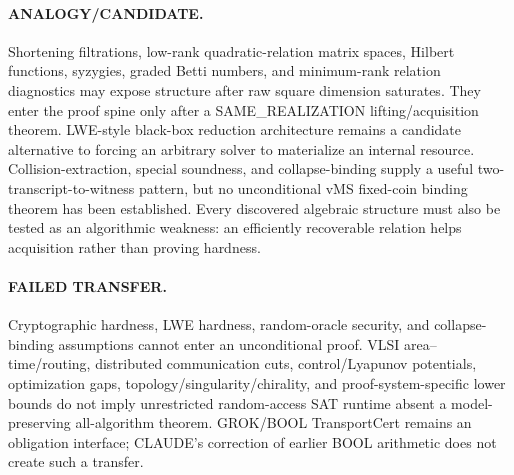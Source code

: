 \documentclass[11pt]{article}
\begin{document}
\paragraph{ANALOGY/CANDIDATE.}
Shortening filtrations, low-rank quadratic-relation matrix spaces, Hilbert functions, syzygies, graded Betti numbers, and minimum-rank relation diagnostics may expose structure after raw square dimension saturates. They enter the proof spine only after a SAME\_REALIZATION lifting/acquisition theorem. LWE-style black-box reduction architecture remains a candidate alternative to forcing an arbitrary solver to materialize an internal resource. Collision-extraction, special soundness, and collapse-binding supply a useful two-transcript-to-witness pattern, but no unconditional vMS fixed-coin binding theorem has been established. Every discovered algebraic structure must also be tested as an algorithmic weakness: an efficiently recoverable relation helps acquisition rather than proving hardness.

\paragraph{FAILED TRANSFER.}
Cryptographic hardness, LWE hardness, random-oracle security, and collapse-binding assumptions cannot enter an unconditional proof. VLSI area--time/routing, distributed communication cuts, control/Lyapunov potentials, optimization gaps, topology/singularity/chirality, and proof-system-specific lower bounds do not imply unrestricted random-access SAT runtime absent a model-preserving all-algorithm theorem. GROK/BOOL TransportCert remains an obligation interface; CLAUDE's correction of earlier BOOL arithmetic does not create such a transfer.
\end{document}
